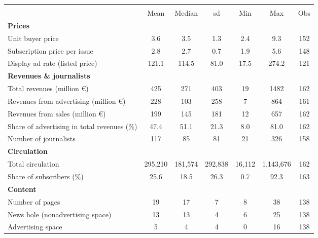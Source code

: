 {
\def\sym#1{\ifmmode^{#1}\else\(^{#1}\)\fi}
\begin{tabular}{l*{1}{cccccc}}
\hline\hline
                    &\multicolumn{6}{c}{}                                                         \\
                    &        Mean&      Median&          sd&         Min&         Max&         Obs\\
\hline
\textbf{Prices}     &            &            &            &            &            &            \\
Unit buyer price    &         3.6&         3.5&         1.3&         2.4&         9.3&         152\\
Subscription price per issue&         2.8&         2.7&         0.7&         1.9&         5.6&         148\\
Display ad rate (listed price)&       121.1&       114.5&        81.0&        17.5&       274.2&         121\\
\textbf{Revenues \& journalists}&            &            &            &            &            &            \\
Total revenues (million \euro)&         425&         271&         403&          19&        1482&         162\\
Revenues from advertising (million \euro)&         228&         103&         258&           7&         864&         161\\
Revenues from sales (million \euro)&         199&         145&         181&          12&         657&         162\\
Share of advertising in total revenues (\%)&        47.4&        51.1&        21.3&         8.0&        81.0&         162\\
Number of journalists&         117&          85&          81&          21&         326&         158\\
\textbf{Circulation}&            &            &            &            &            &            \\
Total circulation   &     295,210&     181,574&     292,838&      16,112&   1,143,676&         162\\
Share of subscribers (\%)&        25.6&        18.5&        26.3&         0.7&        92.3&         163\\
\textbf{Content}    &            &            &            &            &            &            \\
Number of pages     &          19&          17&           7&           8&          38&         138\\
News hole (nonadvertising space)&          13&          13&           4&           6&          25&         138\\
Advertising space   &           5&           4&           4&           0&          16&         138\\
\hline\hline
\end{tabular}
}
